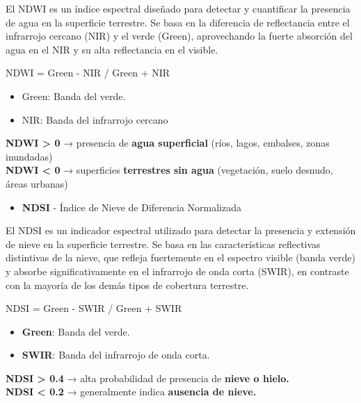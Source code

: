 \documentclass[
]{book}
\providecommand{\tightlist}{%
  \setlength{\itemsep}{0pt}\setlength{\parskip}{0pt}}
\begin{document}
El NDWI es un índice espectral diseñado para detectar y cuantificar la presencia de agua en la superficie terrestre. Se basa en la diferencia de reflectancia entre el infrarrojo cercano (NIR) y el verde (Green), aprovechando la fuerte absorción del agua en el NIR y su alta reflectancia en el visible.

NDWI = Green - NIR / Green + NIR\hspace{0pt}

\begin{itemize}
\tightlist
\item
  Green: Banda del verde.\\
\item
  NIR: Banda del infrarrojo cercano
\end{itemize}

\textbf{NDWI \textgreater{} 0} → presencia de \textbf{agua superficial} (ríos, lagos, embalses, zonas inundadas)\\
\textbf{NDWI \textless{} 0} → superficies \textbf{terrestres sin agua} (vegetación, suelo desnudo, áreas urbanas)

\begin{itemize}
\tightlist
\item
  \textbf{NDSI} - Índice de Nieve de Diferencia Normalizada
\end{itemize}

El NDSI es un indicador espectral utilizado para detectar la presencia y extensión de nieve en la superficie terrestre. Se basa en las características reflectivas distintivas de la nieve, que refleja fuertemente en el espectro visible (banda verde) y absorbe significativamente en el infrarrojo de onda corta (SWIR), en contraste con la mayoría de los demás tipos de cobertura terrestre.

NDSI = Green - SWIR / Green + SWIR\hspace{0pt}

\begin{itemize}
\tightlist
\item
  \textbf{Green}: Banda del verde.\\
\item
  \textbf{SWIR}: Banda del infrarrojo de onda corta.
\end{itemize}

\textbf{NDSI \textgreater{} 0.4} → alta probabilidad de presencia de \textbf{nieve o hielo.}\\
\textbf{NDSI \textless{} 0.2} → generalmente indica \textbf{ausencia de nieve.}
\end{document}
